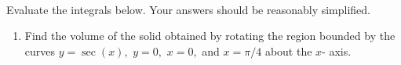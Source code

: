 \documentclass[11pt,fleqn]{article}
\begin{document}
\renewcommand{\headrulewidth}{0pt}
\newcommand{\blank}[1]{\rule{#1}{0.75pt}}
\newcommand{\bc}{\begin{center}}
\newcommand{\ec}{\end{center}}
\renewcommand{\d}{\displaystyle}

\vspace*{-0.7in}

\begin{center}
  \large
  \\
   
\end{center}
 Evaluate the integrals below. Your answers should be reasonably simplified. 
\begin{enumerate}
\item Find the volume of the solid obtained by rotating the region bounded by the curves $y=\sec(x),$ $y=0,$ $x=0,$ and $x=\pi/4$ about the $x$- axis.\\
\vfill


\end{enumerate}
\end{document}
